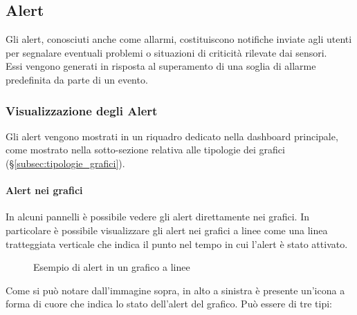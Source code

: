 \subsection{Alert}
Gli alert, conosciuti anche come allarmi, costituiscono notifiche inviate agli utenti per segnalare eventuali problemi o situazioni di criticità rilevate dai sensori.\\
Essi vengono generati in risposta al superamento di una soglia di allarme predefinita da parte di un evento.\\

\subsubsection{Visualizzazione degli Alert}
Gli alert vengono mostrati in un riquadro dedicato nella dashboard principale, come mostrato nella sotto-sezione relativa alle tipologie dei grafici (\S\ref{subsec:tipologie_grafici}).\\

\paragraph{Alert nei grafici}
In alcuni pannelli è possibile vedere gli alert direttamente nei grafici. In particolare è possibile visualizzare gli alert nei grafici a linee come una linea tratteggiata verticale che indica il punto nel tempo in cui l'alert è stato attivato.\\
\begin{figure}[H]
    \centering
    \caption{Esempio di alert in un grafico a linee}
    \label{fig:my_label}
\end{figure}
Come si può notare dall'immagine sopra, in alto a sinistra è presente un'icona a forma di cuore che indica lo stato dell'alert del grafico. Può essere di tre tipi:

